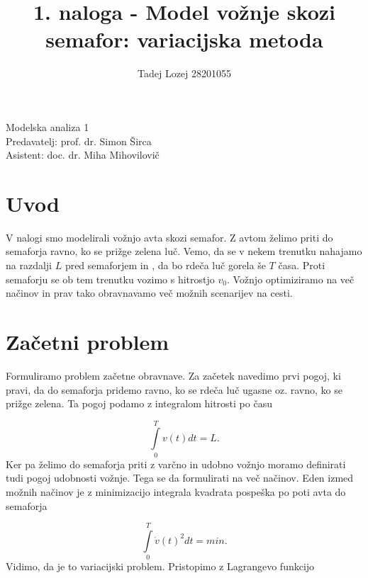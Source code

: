 \documentclass[slovene,11pt,a4paper]{article}
\begin{document}
\title{1. naloga - Model vožnje skozi semafor: variacijska metoda}
\author{Tadej Lozej 28201055}
\maketitle
\begin{center}
Modelska analiza 1 \\
\bigskip
Predavatelj: prof. dr. Simon Širca \\
Asistent: doc. dr. Miha Mihovilovič
\end{center}

\newpage

\tableofcontents

\newpage

\section{Uvod}


V nalogi smo modelirali vožnjo avta skozi semafor. Z avtom želimo priti do semaforja ravno, ko se prižge zelena luč. Vemo, da se v nekem trenutku nahajamo na razdalji $L$ pred semaforjem in , da bo rdeča luč gorela še $T$ časa. Proti semaforju se ob tem trenutku vozimo s hitrostjo $v_0$. Vožnjo optimiziramo na več načinov in prav tako obravnavamo več možnih scenarijev na cesti.

\section{Začetni problem}

Formuliramo problem začetne obravnave. Za začetek navedimo prvi pogoj, ki pravi, da do semaforja pridemo ravno, ko se rdeča luč ugasne oz. ravno, ko se prižge zelena. Ta pogoj podamo z integralom hitrosti po času

\begin{equation}
\int\limits_{0}^{T} v(t) dt = L.
\end{equation}
Ker pa želimo do semaforja priti z varčno in udobno vožnjo moramo definirati tudi pogoj udobnosti vožnje. Tega se da formulirati na več načinov. Eden izmed možnih načinov je z minimizacijo integrala kvadrata pospeška po poti avta do semaforja

\begin{equation}
\int\limits_{0}^{T} \dot{v}(t)^2 dt = min.
\end{equation}
Vidimo, da je to variacijski problem. Pristopimo z Lagrangevo funkcijo
\end{document}
